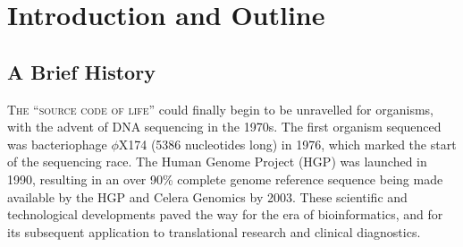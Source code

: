 \cleartorightpage

\chapter{Introduction and Outline}\label{introduction}
\setcounter{figure}{-1}
\setcounter{table}{-1}
\setcounter{section}{-1}
\setcounter{NAT@ctr}{-1}

\setlength\parindent{0pt}

\section{A Brief History} %

\lettrine[lines=3,lraise=-0.1,lhang=0.3,findent=0.5em,nindent=0em]{\textcolor{hexy-red}{\fontEBGaramondInitials{}T}}{he ``source code of life''} could finally begin to be unravelled for organisms, with the advent of DNA sequencing in the 1970s.
The first organism sequenced was bacteriophage $\phi$X174 (5386 nucleotides long) in 1976\cite{Sanger_1977}, which marked the start of the sequencing race.
The Human Genome Project (HGP) was launched in 1990\cite{HGP}, resulting in an over 90\% complete genome reference sequence being made available by the HGP and Celera Genomics by 2003.
These scientific and technological developments paved the way for the era of bioinformatics, and for its subsequent application to translational research and clinical diagnostics.

